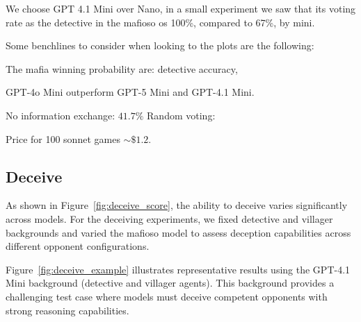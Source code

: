 \documentclass{article}
\begin{document}
We choose GPT 4.1 Mini over Nano, in a small experiment we saw that its voting rate as the detective in the mafioso os 100\%, compared to 67\%, by mini.



Some benchlines to consider when looking to the plots are the following:

The mafia winning probability are: detective accuracy, 

GPT-4o Mini outperform GPT-5 Mini and GPT-4.1 Mini.



No information exchange: $41.7\%$
Random voting: 

Price for 100 sonnet games $\sim \$1.2$.

\subsection{Deceive}

As shown in Figure~\ref{fig:deceive_score}, the ability to deceive varies significantly across models. For the deceiving experiments, we fixed detective and villager backgrounds and varied the mafioso model to assess deception capabilities across different opponent configurations.

Figure~\ref{fig:deceive_example} illustrates representative results using the GPT-4.1 Mini background (detective and villager agents). This background provides a challenging test case where models must deceive competent opponents with strong reasoning capabilities.
\end{document}
